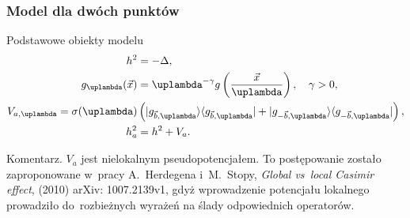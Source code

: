 \documentclass[10pt,t]{beamer}
\begin{document}
\begin{frame}
  \frametitle{Model dla dwóch punktów}


  Podstawowe obiekty modelu
  \begin{subequations}
    \begin{align}
      \label{eq:Efekt-Casimira-22-A}
      h^{ 2 } &= -\Delta, \\
      \label{eq:Efekt-Casimira-22-B}
      g_{ \lambda }( \vecx )
              &= \lambda^{ -\gamma } g\left( \frac{ \vecx }{ \lambda } \right), \quad
                \gamma > 0, \\
      \label{eq:Efekt-Casimira-22-C}
      V_{ a, \lambda } =
      \sigma( \lambda )
              &\left( | g_{ \vecb, \lambda } \rangle
                \langle g_{ \vecb, \lambda } | + | g_{ -\vecb, \lambda } \rangle
                \langle g_{ -\vecb, \lambda } | \right), \\
      \label{eq:Efekt-Casimira-22-D}
      h_{ a }^{ 2 } &= h^{ 2 } + V_{ a }.
    \end{align}
  \end{subequations}

  Komentarz. $V_{ a }$ jest nielokalnym pseudopotencjałem. To postępowanie
  zostało zaproponowane w~pracy A.~Herdegena i~M.~Stopy, \textit{Global
    vs~local Casimir effect}, (2010) arXiv: 1007.2139v1, gdyż
  wprowadzenie potencjału lokalnego prowadziło do~rozbieżnych
  wyrażeń na ślady odpowiednich operatorów.

\end{frame}
\end{document}
